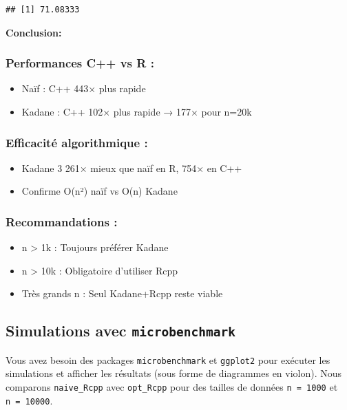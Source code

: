 \documentclass[
]{article}
\begin{document}
\begin{verbatim}
## [1] 71.08333
\end{verbatim}

\textbf{Conclusion:}

\subsubsection{Performances C++ vs R :}\label{performances-c-vs-r}

\begin{itemize}
\item
  Naïf : C++ 443× plus rapide
\item
  Kadane : C++ 102× plus rapide → 177× pour n=20k
\end{itemize}

\subsubsection{Efficacité algorithmique
:}\label{efficacituxe9-algorithmique}

\begin{itemize}
\item
  Kadane 3 261× mieux que naïf en R, 754× en C++
\item
  Confirme O(n²) naïf vs O(n) Kadane
\end{itemize}

\subsubsection{Recommandations :}\label{recommandations}

\begin{itemize}
\item
  n \textgreater{} 1k : Toujours préférer Kadane
\item
  n \textgreater{} 10k : Obligatoire d'utiliser Rcpp
\item
  Très grands n : Seul Kadane+Rcpp reste viable
\end{itemize}

\subsection{\texorpdfstring{Simulations avec
\texttt{microbenchmark}}{Simulations avec microbenchmark}}\label{simulations-avec-microbenchmark}

Vous avez besoin des packages \texttt{microbenchmark} et
\texttt{ggplot2} pour exécuter les simulations et afficher les résultats
(sous forme de diagrammes en violon). Nous comparons
\texttt{naive\_Rcpp} avec \texttt{opt\_Rcpp} pour des tailles de données
\texttt{n\ =\ 1000} et \texttt{n\ =\ 10000}.
\end{document}
